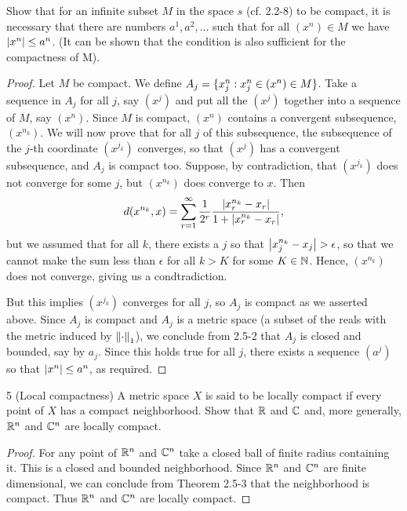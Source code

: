 \begin{exercise}{4}
Show that for an infinite subset $M$ in the space $s$ (cf. 2.2-8) to be compact, it is necessary that there are numbers $a^1,a^2,\dots$ such that for all $(x^n)\in M$ we have $\left\lvert x^n\right\rvert\leq a^n$. (It can be shown that the condition is also sufficient for the compactness of M).
\end{exercise}
\begin{proof}
Let $M$ be compact. We define $A_j=\{x^n_j:x^n_j\in (x^n)\in M\}$. Take a sequence in $A_j$ for all $j$, say $(x^j)$ and put all the $(x^j)$ together into a sequence of $M$, say $(x^n)$. Since $M$ is compact, $(x^n)$ contains a convergent subsequence, $(x^{n_k})$. We will now prove that for all $j$ of this subsequence, the subsequence of the $j$-th coordinate $(x^{j_k})$ converges, so that $(x^j)$ has a convergent subsequence, and $A_j$ is compact too. Suppose, by contradiction, that $(x^{j_k})$ does not converge for some $j$, but $(x^{n_k})$ does converge to $x$. Then 
\[
d(x^{n_k}, x)
=\sum_{r=1}^\infty \frac{1}{2^r}\frac{\left\lvert x^{n_k}_r-x_r\right\rvert}{1+\left\lvert x^{n_k}_r-x_r\right\rvert},
\]
but we assumed that for all $k$, there exists a $j$ so that $\left\lvert x^{n_k}_j-x_j\right\rvert>\epsilon$, so that we cannot make the sum less than $\epsilon$ for all $k>K$ for some $K\in\mathbb{N}$. Hence, $(x^{n_k})$ does not converge, giving us a condtradiction. 

But this implies $(x^{j_k})$ converges for all $j$, so $A_j$ is compact as we asserted above. Since $A_j$ is compact and $A_j$ is a metric space (a subset of the reals with the metric induced by $\left\lVert \cdot\right\rVert_1$), we conclude from 2.5-2 that $A_j$ is closed and bounded, say by $a_j$. Since this holds true for all $j$, there exists a sequence $(a^j)$ so that $\left\lvert x^n\right\rvert\leq a^n$, as required.
\end{proof}

\begin{exercise}{5 (Local compactness)}
A metric space $X$ is said to be locally compact if every point of $X$ has a compact neighborhood. Show that $\mathbb{R}$ and $\mathbb{C}$ and, more generally, $\mathbb{R}^n$ and $\mathbb{C}^n$ are locally compact. 
\end{exercise}
\begin{proof}
For any point of $\mathbb{R}^n$ and $\mathbb{C}^n$ take a closed ball of finite radius containing it. This is a closed and bounded neighborhood. Since $\mathbb{R}^n$ and $\mathbb{C}^n$ are finite dimensional, we can conclude from Theorem 2.5-3 that the neighborhood is compact. Thus $\mathbb{R}^n$ and $\mathbb{C}^n$ are locally compact.
\end{proof}

